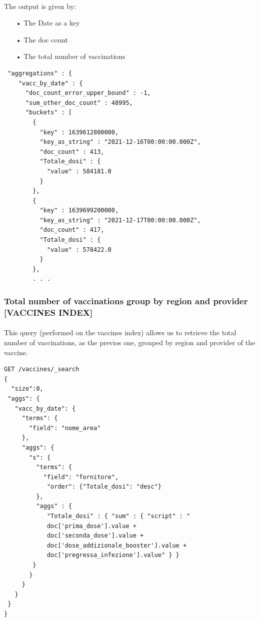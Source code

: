 \documentclass[a4paper,12pt]{article}
\begin{document}
\paragraph{} The output is given by: 
\begin{itemize}[noitemsep]
\item[•] The Date as a key
\item[•] The doc count
\item[•] The total number of vaccinations
\end{itemize}
\begin{tcolorbox}[colback=red!5!white,colframe=red!75!black,title=OUTPUT]
\begin{verbatim}
 "aggregations" : {
    "vacc_by_date" : {
      "doc_count_error_upper_bound" : -1,
      "sum_other_doc_count" : 48995,
      "buckets" : [
        {
          "key" : 1639612800000,
          "key_as_string" : "2021-12-16T00:00:00.000Z",
          "doc_count" : 413,
          "Totale_dosi" : {
            "value" : 584181.0
          }
        },
        {
          "key" : 1639699200000,
          "key_as_string" : "2021-12-17T00:00:00.000Z",
          "doc_count" : 417,
          "Totale_dosi" : {
            "value" : 578422.0
          }
        },
        . . .
\end{verbatim}
\end{tcolorbox}
\newpage

\subsubsection{Total number of vaccinations group by region and provider [VACCINES INDEX]}
\paragraph{} This query (performed on the vaccines index) allows us to retrieve the total number of vaccinations, as the previos one, grouped by region and provider of the vaccine.
\begin{tcolorbox}[colback=green!5!white,colframe=green!75!black,title=QUERY]
\begin{verbatim}
GET /vaccines/_search
{
  "size":0,
 "aggs": {
   "vacc_by_date": {
     "terms": {
       "field": "nome_area"
     },
     "aggs": {
       "s": {
         "terms": {
           "field": "fornitore",
            "order": {"Totale_dosi": "desc"}
         },
         "aggs" : {
            "Totale_dosi" : { "sum" : { "script" : "
            doc['prima_dose'].value + 
            doc['seconda_dose'].value + 
            doc['dose_addizionale_booster'].value + 
            doc['pregressa_infezione'].value" } }
        }
       }
     }
   }
 }
}
\end{verbatim}
\end{tcolorbox}
\newpage
\end{document}

